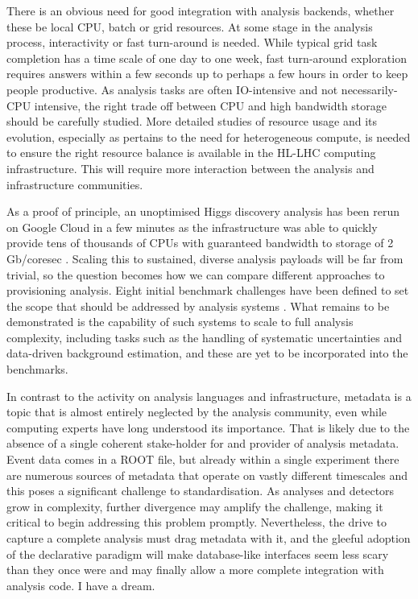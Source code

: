 \documentclass[11pt,a4paper]{article}
\begin{document}
There is an obvious need for good integration with analysis backends,
whether these be local CPU, batch or grid resources. At some stage in
the analysis process, interactivity or fast turn-around is needed. While
typical grid task completion has a time scale of one day to one week,
fast turn-around exploration requires answers within a few seconds up to
perhaps a few hours in order to keep people productive. As analysis
tasks are often IO-intensive and not necessarily-CPU intensive, the
right trade off between CPU and high bandwidth storage should be
carefully studied. More detailed studies of resource usage and its
evolution, especially as pertains to the need for heterogeneous compute,
is needed to ensure the right resource balance is available in the
HL-LHC computing infrastructure. This will require more interaction
between the analysis and infrastructure communities.

As a proof of principle, an unoptimised Higgs discovery analysis has
been rerun on Google Cloud in a few minutes as the infrastructure was
able to quickly provide tens of thousands of CPUs with guaranteed
bandwidth to storage of 2 Gb/coresec \cite{Ref12}. Scaling this to
sustained, diverse analysis payloads will be far from trivial, so the
question becomes how we can compare different approaches to provisioning
analysis. Eight initial benchmark challenges have been defined to set
the scope that should be addressed by analysis systems \cite{Ref11}. What
remains to be demonstrated is the capability of such systems to scale to
full analysis complexity, including tasks such as the handling of
systematic uncertainties and data-driven background estimation, and
these are yet to be incorporated into the benchmarks.

In contrast to the activity on analysis languages and infrastructure,
metadata is a topic that is almost entirely neglected by the analysis
community, even while computing experts have long understood its
importance. That is likely due to the absence of a single coherent
stake-holder for and provider of analysis metadata. Event data comes in
a ROOT file, but already within a single experiment there are numerous
sources of metadata that operate on vastly different timescales and this
poses a significant challenge to standardisation. As analyses and
detectors grow in complexity, further divergence may amplify the
challenge, making it critical to begin addressing this problem promptly.
Nevertheless, the drive to capture a complete analysis must drag
metadata with it, and the gleeful adoption of the declarative paradigm
will make database-like interfaces seem less scary than they once were
and may finally allow a more complete integration with analysis code. I
have a dream.
\end{document}

